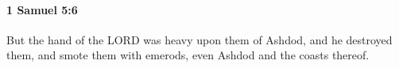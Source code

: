 
		\paragraph{1 Samuel 5:6} %
			\label{1SAMUEL-5-6}

			But the hand of the LORD was heavy upon them of Ashdod, and he destroyed them, and smote them with emerods, even Ashdod and the coasts thereof.


